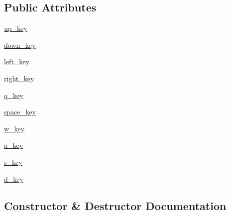 \subsection*{Public Attributes}
\begin{DoxyCompactItemize}
\item 
\mbox{\hyperlink{classbridges_1_1input__helper_1_1_input_helper_ab73e09b11d389d7dd63f0772eba7f39e}{up\+\_\+key}}
\item 
\mbox{\hyperlink{classbridges_1_1input__helper_1_1_input_helper_aa04e96346543b8cdf8352440b021ba53}{down\+\_\+key}}
\item 
\mbox{\hyperlink{classbridges_1_1input__helper_1_1_input_helper_a15b6199dc0dfd7354557a19e07755f5a}{left\+\_\+key}}
\item 
\mbox{\hyperlink{classbridges_1_1input__helper_1_1_input_helper_a1d34896a89ac06f8ab93915e668f4f75}{right\+\_\+key}}
\item 
\mbox{\hyperlink{classbridges_1_1input__helper_1_1_input_helper_ad50670b8a6479a116dd9f1468e2b6a66}{q\+\_\+key}}
\item 
\mbox{\hyperlink{classbridges_1_1input__helper_1_1_input_helper_a7500af436b4d85fc13fb351d661cf0d9}{space\+\_\+key}}
\item 
\mbox{\hyperlink{classbridges_1_1input__helper_1_1_input_helper_a5805e22dfd0bda43e27aacb3bc638df3}{w\+\_\+key}}
\item 
\mbox{\hyperlink{classbridges_1_1input__helper_1_1_input_helper_acb7d988d14de58f5fff87ad91bef430f}{a\+\_\+key}}
\item 
\mbox{\hyperlink{classbridges_1_1input__helper_1_1_input_helper_a88978da995aaea7c6267a72cbd4d11c9}{s\+\_\+key}}
\item 
\mbox{\hyperlink{classbridges_1_1input__helper_1_1_input_helper_a04f38a8c929984bdc0c6f4c98927c8dd}{d\+\_\+key}}
\end{DoxyCompactItemize}


\subsection{Constructor \& Destructor Documentation}
\mbox{\label{classbridges_1_1input__helper_1_1_input_helper_a1e5078f3c252de554409d3fdb49fcaaa}} 

